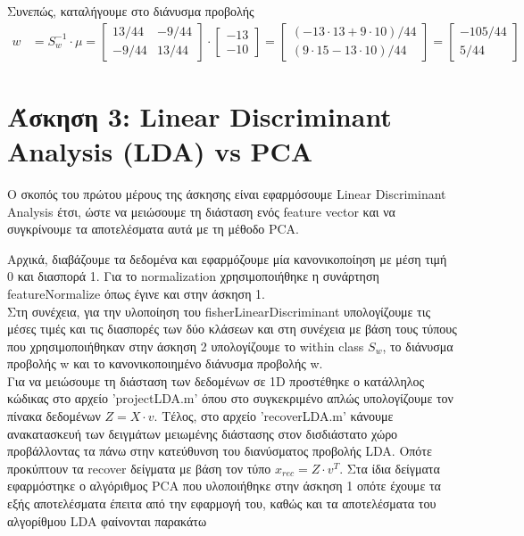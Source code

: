 \documentclass{article}
\begin{document}
	\noindent
	Συνεπώς, καταλήγουμε στο διάνυσμα προβολής
	\begin{align*}
		w &= S_{w}^{-1} \cdot μ
		   = \begin{bmatrix}
			   	13/44 & -9/44 \\
			   	-9/44 & 13/44
		     \end{bmatrix} \cdot
	     	 \begin{bmatrix}
	     	 	-13 \\
	     	 	-10
	     	 \end{bmatrix}
     	   = \begin{bmatrix}
	     	   	(-13 \cdot 13 + 9 \cdot 10)/44 \\
	     	   	(9 \cdot 15 - 13 \cdot 10)/44
     	   	 \end{bmatrix}	  
           = \begin{bmatrix}
	           	-105/44 \\
	           	5/44
             \end{bmatrix}   	
	\end{align*}
	
\section*{Άσκηση 3: Linear Discriminant Analysis (LDA) vs PCA}
	Ο σκοπός του πρώτου μέρους της άσκησης είναι εφαρμόσουμε Linear Discriminant Analysis έτσι, ώστε να μειώσουμε τη διάσταση ενός feature vector και να συγκρίνουμε τα αποτελέσματα αυτά με τη μέθοδο PCA. 
	
	\noindent
	Aρχικά, διαβάζουμε τα δεδομένα και εφαρμόζουμε μία κανονικοποίηση με μέση τιμή 0 και διασπορά 1. Για το normalization χρησιμοποιήθηκε η συνάρτηση featureNormalize όπως έγινε και στην άσκηση 1. \\
	
	\noindent
	Στη συνέχεια, για την υλοποίηση του fisherLinearDiscriminant υπολογίζουμε τις μέσες τιμές και τις διασπορές των δύο κλάσεων και στη συνέχεια με βάση τους τύπους που χρησιμοποιήθηκαν στην άσκηση 2 υπολογίζουμε το within class $S_{w}$, το διάνυσμα προβολής w και το κανονικοποιημένο διάνυσμα προβολής w.\\
	
	\noindent
	Για να μειώσουμε τη διάσταση των δεδομένων σε 1D προστέθηκε ο κατάλληλος κώδικας στο αρχείο 'projectLDA.m' όπου στο συγκεκριμένο απλώς υπολογίζουμε τον πίνακα δεδομένων $Z = X \cdot v$. Τέλος, στο αρχείο 'recoverLDA.m' κάνουμε ανακατασκευή των δειγμάτων μειωμένης διάστασης στον δισδιάστατο χώρο προβάλλοντας τα πάνω στην κατεύθυνση του διανύσματος προβολής LDA. Οπότε προκύπτουν τα recover δείγματα με βάση τον τύπο $x_{rec} = Z \cdot v^{T}$. Στα ίδια δείγματα εφαρμόστηκε ο αλγόριθμος PCA που υλοποιήθηκε στην άσκηση 1 οπότε έχουμε τα εξής αποτελέσματα έπειτα από την εφαρμογή του, καθώς και τα αποτελέσματα του αλγορίθμου LDA φαίνονται παρακάτω
	
\end{document}
